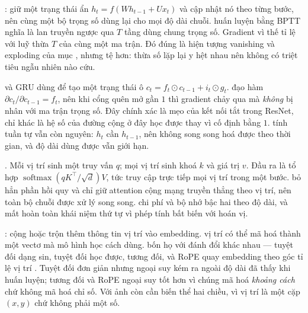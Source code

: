 \documentclass[../../../deep_learning.tex]{subfiles}
\begin{document}
\begin{mach}
\item {} \gp {}: giữ một trạng thái ẩn \(h_t = f(Wh_{t-1} + Ux_t)\) và cập nhật nó theo từng bước, nên cùng một bộ trọng số dùng lại cho mọi độ dài chuỗi. \vdm huấn luyện bằng BPTT nghĩa là lan truyền ngược qua \(T\) tầng dùng chung trọng số. Gradient vì thế tỉ lệ với luỹ thừa \(T\) của cùng một ma trận. Đó đúng là hiện tượng vanishing và exploding của mục , nhưng tệ hơn: thừa số lặp lại y hệt nhau nên không có triệt tiêu ngẫu nhiên nào cứu.
\item {} \gp {} \cite{hochreiter1997lstm} và GRU dùng  để tạo một trạng thái ô \(c_t = f_t \odot c_{t-1} + i_t \odot g_t\). \hq đạo hàm \(\partial c_t/\partial c_{t-1} = f_t\), nên khi cổng quên mở gần \(1\) thì gradient chảy qua mà \emph{không} bị nhân với ma trận trọng số. Đây chính xác là mẹo của kết nối tắt trong ResNet, chỉ khác là hệ số của đường cộng ở đây học được thay vì cố định bằng \(1\). \vdm tính tuần tự vẫn còn nguyên: \(h_t\) cần \(h_{t-1}\), nên không song song hoá được theo thời gian, và độ dài dùng được vẫn giới hạn.
\item {} \gp {}. Mỗi vị trí sinh một truy vấn \(q\); mọi vị trí sinh khoá \(k\) và giá trị \(v\). Đầu ra là tổ hợp \(\operatorname{softmax}(qK^\top/\sqrt{d})V\), tức truy cập trực tiếp mọi vị trí trong một bước.  \cite{vaswani2017attention} bỏ hẳn phần hồi quy và chỉ giữ attention cộng mạng truyền thẳng theo vị trí, nên toàn bộ chuỗi được xử lý song song. \gia chi phí và bộ nhớ bậc hai theo độ dài, và mất hoàn toàn khái niệm thứ tự vì phép tính bất biến với hoán vị.
\item {} \gp {}: cộng hoặc trộn thêm thông tin vị trí vào embedding. \gd vị trí có thể mã hoá thành một vectơ mà mô hình học cách dùng. \hq bốn họ với đánh đổi khác nhau --- tuyệt đối dạng sin, tuyệt đối học được, tương đối, và RoPE quay embedding theo góc tỉ lệ vị trí \cite{su2024roformer}. Tuyệt đối đơn giản nhưng ngoại suy kém ra ngoài độ dài đã thấy khi huấn luyện; tương đối và RoPE ngoại suy tốt hơn vì chúng mã hoá \emph{khoảng cách} chứ không mã hoá chỉ số. Với ảnh còn cần biến thể hai chiều, vì vị trí là một cặp \((x,y)\) chứ không phải một số.

\end{mach}
\end{document}

